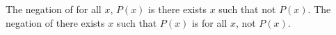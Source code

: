The negation of for all $x$, $P(x)$ is there exists $x$ such that not $P(x)$.
The negation of there exists $x$ such that $P(x)$ is for all $x$, not $P(x)$.